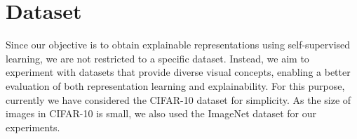 \section{Dataset}
\label{sec:dataset}

Since our objective is to obtain explainable representations using self-supervised learning, we are not restricted to a specific dataset. Instead, we aim to experiment with datasets that provide diverse visual concepts, enabling a better evaluation of both representation learning and explainability. For this purpose, currently we have considered the CIFAR-10 dataset for simplicity. 
As the size of images in CIFAR-10 is small, we also used the ImageNet dataset for our experiments. 